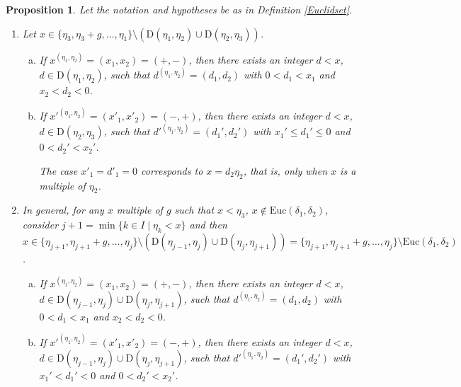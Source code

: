 \documentclass[11pt]{amsart}
\newtheorem{proposition}[theorem]{Proposition}
\theoremstyle{remark}
\begin{document}
\begin{proposition}\label{main}
Let the notation and hypotheses be as in Definition \ref{Euclidset}. 
	\begin{enumerate}[(1)]
		\item Let $x\in \{\eta_3,\eta_3+g,\ldots, \eta_1\}\setminus (\mathrm D(\eta_1,\eta_2)\cup \mathrm D(\eta_2,\eta_3))$.
		     \begin{enumerate}[(a)]
		     \item If $x^{(\eta_1,\eta_2)}=(x_1,x_2)=(+,-)$, then there exists an integer $d<x$, $d\in \mathrm D(\eta_1,\eta_2)$, such that $d^{(\eta_1,\eta_2)}=(d_1,d_2)$ with $0<d_1<x_1$ and $x_2<d_2<0$. 
		     \item If $x'^{(\eta_1,\eta_2)}=(x'_1,x'_2)=(-,+)$, then there exists an integer $d<x$, $d\in \mathrm D(\eta_2,\eta_3)$, such that $d'^{(\eta_1,\eta_2)}=(d_1',d_2')$ with $x_1'\le d_1'\le 0$ and $0<d_2'<x_2'$.
		     
		     The case $x'_1=d'_1=0$ corresponds to $x=d_2\eta_2$, that is, only when $x$ is a multiple of $\eta_2$.
	        \end{enumerate}
        \item In general, for any $x$ multiple of $g$ such that $x<\eta_3$, $x\notin \mathrm{Euc}(\delta_1,\delta_2)$, consider $j+1=\min\{k\in I\mid \eta_k<x\}$ and then $x\in \{\eta_{j+1},\eta_{j+1}+g,\ldots, \eta_{j}\}\setminus (\mathrm D(\eta_{j-1},\eta_j)\cup \mathrm D(\eta_j,\eta_{j+1})) = \{\eta_{j+1},\eta_{j+1}+g,\ldots, \eta_{j}\}\setminus \mathrm{Euc}(\delta_1,\delta_2)$.
        \begin{enumerate}[(a)]
        	\item If  $x^{(\eta_1,\eta_2)}=(x_1,x_2)=(+,-)$, then there exists an integer $d<x$, $d\in \mathrm D(\eta_{j-1},\eta_{j})\cup \mathrm D(\eta_{j},\eta_{j+1})$, such that $d^{(\eta_1,\eta_2)}=(d_1,d_2)$ with $0<d_1<x_1$ and $x_2<d_2<0$.
        	\item If $x'^{(\eta_1,\eta_2)}=(x'_1,x'_2)=(-,+)$, then there exists an integer $d<x$, $d\in \mathrm D(\eta_{j-1},\eta_{j})\cup \mathrm D(\eta_{j},\eta_{j+1})$, such that $d'^{(\eta_1,\eta_2)}=(d_1',d_2')$ with $x_1'<d_1'<0$ and $0<d_2'<x_2'$.
        \end{enumerate}
	\end{enumerate}
\end{proposition}
\end{document}
